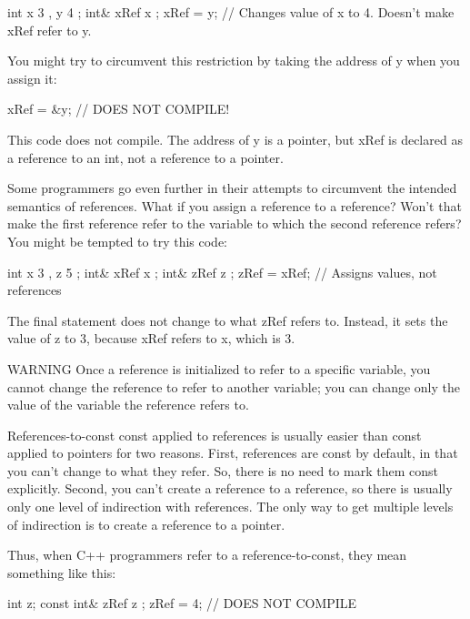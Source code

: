 \begin{cpp}
int x { 3 }, y { 4 };
int& xRef { x };
xRef = y; // Changes value of x to 4. Doesn't make xRef refer to y.
\end{cpp}

You might try to circumvent this restriction by taking the address of y when you assign it:

\begin{cpp}
xRef = &y; // DOES NOT COMPILE!
\end{cpp}

This code does not compile. The address of y is a pointer, but xRef is declared as a reference to an int, not a reference to a pointer.

Some programmers go even further in their attempts to circumvent the intended semantics of references. What if you assign a reference to a reference? Won’t that make the first reference refer to the variable to which the second reference refers? You might be tempted to try this code:

\begin{cpp}
int x { 3 }, z { 5 };
int& xRef { x };
int& zRef { z };
zRef = xRef; // Assigns values, not references
\end{cpp}

The final statement does not change to what zRef refers to. Instead, it sets the value of z to 3, because xRef refers to x, which is 3.

\begin{myWarning}{WARNING}
Once a reference is initialized to refer to a specific variable, you cannot change the reference to refer to another variable; you can change only the value of the variable the reference refers to.
\end{myWarning}

References-to-const
const applied to references is usually easier than const applied to pointers for two reasons. First, references are const by default, in that you can’t change to what they refer. So, there is no need to mark them const explicitly. Second, you can’t create a reference to a reference, so there is usually only one level of indirection with references. The only way to get multiple levels of indirection is to create a reference to a pointer.

Thus, when C++ programmers refer to a reference-to-const, they mean something like this:

\begin{cpp}
int z;
const int& zRef { z };
zRef = 4; // DOES NOT COMPILE
\end{cpp}

